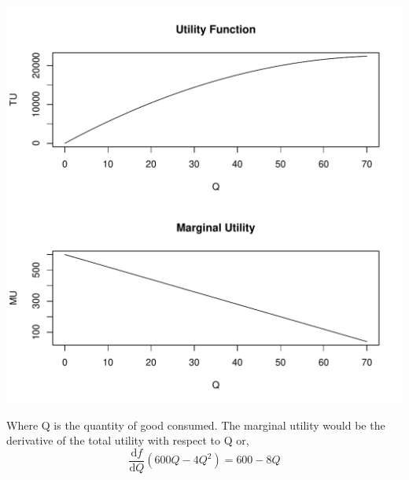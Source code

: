 \documentclass[12pt, a4paper, oneside]{article}\usepackage[]{graphicx}\usepackage[]{color}
\makeatletter
\def\maxwidth{ %
  \ifdim\Gin@nat@width>\linewidth
    \linewidth
  \else
    \Gin@nat@width
  \fi
}
\newenvironment{knitrout}{}{} %
\makeatother
\begin{document}
\begin{knitrout}
\color{fgcolor}
\includegraphics[width=\maxwidth]{figure/TU} 

\end{knitrout}

Where Q is the quantity of good consumed. The marginal utility would be the derivative of the total utility with respect to Q or, 
\vspace{5 mm}
$$ \frac{\mathrm d f}{\mathrm d Q}(600Q - 4Q^2) = 600 - 8Q$$




\end{document}
